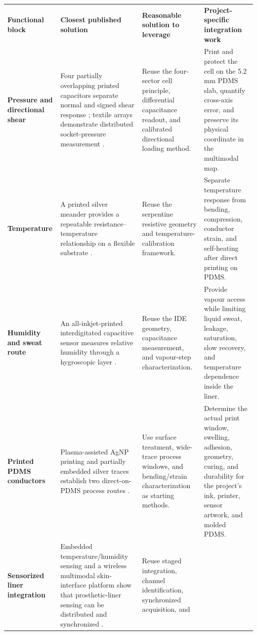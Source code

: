 \begingroup
\fontsize{8.2}{9.65}\selectfont
\renewcommand{\arraystretch}{1.09}
\begin{tabularx}{\linewidth}{>{\raggedright\arraybackslash\bfseries\color{AUBRed}}p{2.45cm}Y Y Y}
\color{white}\textbf{Functional block} &
\color{white}\textbf{Closest published solution} &
\color{white}\textbf{Reasonable solution to leverage} &
\color{white}\textbf{Project-specific integration work} \\
Pressure and directional shear & Four partially overlapping printed
capacitors separate normal and signed shear response
\cite{albrecht2018conf,albrecht2019}; textile arrays demonstrate distributed
socket-pressure measurement \cite{tabor2021}. & Reuse the four-sector cell
principle, differential capacitance readout, and calibrated directional loading
method. & Print and protect the cell on the 5.2 mm PDMS slab, quantify
cross-axis error, and preserve its physical coordinate in the multimodal map. \\
Temperature & A printed silver meander provides a repeatable
resistance--temperature relationship on a flexible substrate \cite{liew2020}. &
Reuse the serpentine resistive geometry and temperature-calibration framework. &
Separate temperature response from bending, compression, conductor strain, and
self-heating after direct printing on PDMS. \\
Humidity and sweat route & An all-inkjet-printed interdigitated capacitive
sensor measures relative humidity through a hygroscopic layer
\cite{aitmammar2020}. & Reuse the IDE geometry, capacitance measurement, and
vapour-step characterization. & Provide vapour access while limiting liquid
sweat, leakage, saturation, slow recovery, and temperature dependence inside
the liner. \\
Printed PDMS conductors & Plasma-assisted AgNP printing and partially embedded
silver traces establish two direct-on-PDMS process routes
\cite{albrecht2018stretch,sun2016}. & Use surface treatment, wide-trace process
windows, and bending/strain characterization as starting methods. & Determine
the actual print window, swelling, adhesion, geometry, curing, and durability
for the project's ink, printer, sensor artwork, and molded PDMS. \\
Sensorized liner integration & Embedded temperature/humidity sensing and a
wireless multimodal skin-interface platform show that prosthetic-liner sensing
can be distributed and synchronized \cite{paterno2020,q3kwak2020}. & Reuse
staged integration, channel identification, synchronized acquisition, and

\end{tabularx}
